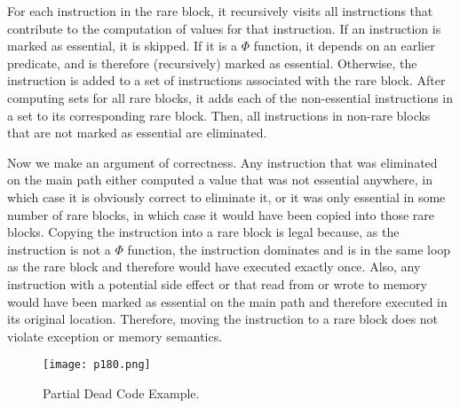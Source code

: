 For each instruction in the rare block, it recursively visits
all instructions that contribute to the computation of values
for that instruction. If an instruction is marked as essential,
it is skipped. If it is a $\Phi$ function, it depends on an earlier
predicate, and is therefore (recursively) marked as essential.
Otherwise, the instruction is added to a set of instructions
associated with the rare block.
After computing sets for all rare blocks, it adds each of the
non-essential instructions in a set to its corresponding rare
block. Then, all instructions in non-rare blocks that are not
marked as essential are eliminated.


Now we make an argument of correctness. Any instruction
that was eliminated on the main path either computed a
value that was not essential anywhere, in which case it is
obviously correct to eliminate it, or it was only essential in
some number of rare blocks, in which case it would have
been copied into those rare blocks. Copying the instruction
into a rare block is legal because, as the instruction is not a $\Phi$
function, the instruction dominates and is in the same loop
as the rare block and therefore would have executed exactly
once. Also, any instruction with a potential side effect or
that read from or wrote to memory would have been marked
as essential on the main path and therefore executed in its
original location. Therefore, moving the instruction to a
rare block does not violate exception or memory semantics.

\begin{figure}[H]
	\centering
	\texttt{[image: p180.png]}
	\caption{Partial Dead Code Example.}
	\label{fig:p180}
\end{figure}